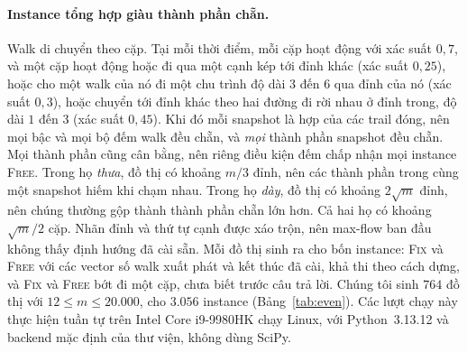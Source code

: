 \documentclass[pdflatex,sn-mathphys-num]{sn-jnl}
\theoremstyle{thmstyleone}%
\theoremstyle{thmstyletwo}%
\theoremstyle{thmstylethree}%
\newcommand{\FIX}{\textup{\textsc{Fix}}}
\newcommand{\FREE}{\textup{\textsc{Free}}}
\begin{document}
\paragraph{Instance tổng hợp giàu thành phần chẵn.} Walk di chuyển theo cặp. Tại mỗi thời điểm, mỗi cặp hoạt động với xác suất $0{,}7$, và một cặp hoạt động hoặc đi qua một cạnh kép tới đỉnh khác (xác suất $0{,}25$), hoặc cho một walk của nó đi một chu trình độ dài $3$ đến $6$ qua đỉnh của nó (xác suất $0{,}3$), hoặc chuyển tới đỉnh khác theo hai đường đi rời nhau ở đỉnh trong, độ dài $1$ đến $3$ (xác suất $0{,}45$). Khi đó mỗi snapshot là hợp của các trail đóng, nên mọi bậc và mọi bộ đếm walk đều chẵn, và \emph{mọi} thành phần snapshot đều chẵn. Mọi thành phần cũng cân bằng, nên riêng điều kiện đếm chấp nhận mọi instance \FREE{}. Trong họ \emph{thưa}, đồ thị có khoảng $m/3$ đỉnh, nên các thành phần trong cùng một snapshot hiếm khi chạm nhau. Trong họ \emph{dày}, đồ thị có khoảng $2\sqrt m$ đỉnh, nên chúng thường gộp thành thành phần chẵn lớn hơn. Cả hai họ có khoảng $\sqrt m/2$ cặp. Nhãn đỉnh và thứ tự cạnh được xáo trộn, nên max-flow ban đầu không thấy định hướng đã cài sẵn. Mỗi đồ thị sinh ra cho bốn instance: \FIX{} và \FREE{} với các vector số walk xuất phát và kết thúc đã cài, khả thi theo cách dựng, và \FIX{} và \FREE{} bớt đi một cặp, chưa biết trước câu trả lời. Chúng tôi sinh $764$ đồ thị với $12\le m\le 20.000$, cho $3.056$ instance (Bảng~\ref{tab:even}). Các lượt chạy này thực hiện tuần tự trên Intel Core i9-9980HK chạy Linux, với Python~3.13.12 và backend mặc định của thư viện, không dùng SciPy.
\end{document}
